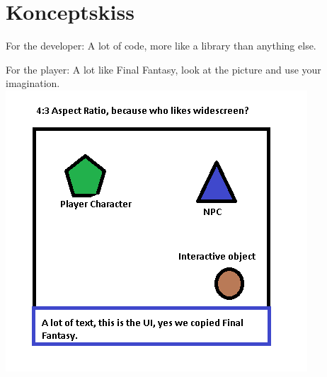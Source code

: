\documentclass[12pt,a4paper]{article}
\begin{document}
\section{Konceptskiss}

For the developer: A lot of code, more like a library than anything else.

For the player: A lot like Final Fantasy, look at the picture and use your imagination.
\includegraphics{Koncept_sketch}





\end{document}
